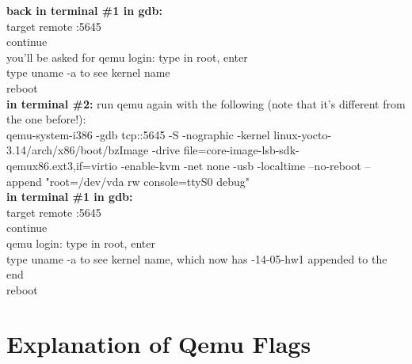 \documentclass[letterpaper,10pt]{article}
\begin{document}
\textbf{back in terminal \#1 in gdb:}\\
  target remote :5645\\
  continue\\
  you'll be asked for qemu login: type in root, enter\\
  type uname -a to see kernel name\\
  reboot\\

\textbf{in terminal \#2:}
  run qemu again with the following (note that it's different from the one before!):\\
    qemu-system-i386 -gdb tcp::5645 -S -nographic -kernel linux-yocto-3.14/arch/x86/boot/bzImage -drive file=core-image-lsb-sdk-qemux86.ext3,if=virtio -enable-kvm -net none -usb -localtime --no-reboot --append "root=/dev/vda rw console=ttyS0 debug"\\
  
\textbf{in terminal \#1 in gdb:}\\
  target remote :5645\\
  continue\\
  qemu login: type in root, enter\\
  type uname -a to see kernel name, which now has -14-05-hw1 appended to the end\\
  reboot\\

\section{Explanation of Qemu Flags}
\end{document}
